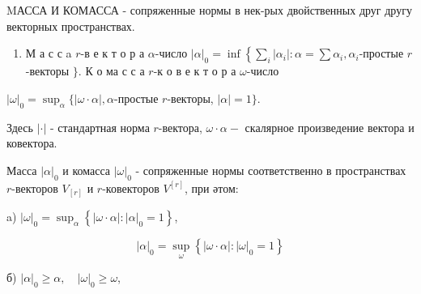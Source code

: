 \documentclass[10pt]{article}
\begin{document}
MАССА И КОМАССА - сопряженные нормы в нек-рых двойственных друг другу векторных пространствах.



\begin{enumerate}

  \item М а с с a $r$-в е к т о р а $\alpha$-число $|\alpha|_{0}=\inf \left\{\sum_{i}\left|\alpha_{i}\right|: \alpha=\sum \alpha_{i}, \alpha_{i}\right.$-простые $r$-векторы $\}$. К о ма с с а $r$-к о в е к т о р а $\omega$-число

\end{enumerate}



$|\omega|_{0}=\sup _{\alpha}\{|\omega \cdot \alpha|, \alpha$-простые $r$-векторы, $|\alpha|=1\}$.



Здесь $|\cdot|$ - стандартная норма $r$-вектора, $\omega \cdot \alpha-$ скалярное произведение вектора и ковектора.



Масса $|\alpha|_{0}$ и комасса $|\omega|_{0}$ - сопряженные нормы соответственно в пространствах $r$-векторов $V_{[r]}$ и $r$-ковекторов $V^{[r]}$, при әтом:



a) $|\omega|_{0}=\sup _{\alpha}\left\{|\omega \cdot \alpha|:|\alpha|_{0}=1\right\}$,



\[

|\alpha|_{0}=\sup _{\omega}\left\{|\omega \cdot \alpha|:|\omega|_{0}=1\right\}

\]



б) $|\alpha|_{0} \geqslant \alpha, \quad|\omega|_{0} \geqslant \omega$,
\end{document}
